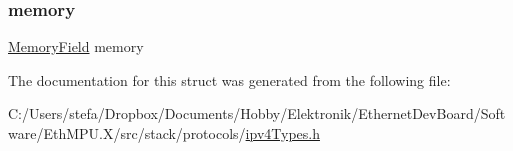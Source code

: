 \mbox{\label{structipv4_packet__t_a7dd6a3160ed58904a4699e281fc4617b}} 
\subsubsection{\texorpdfstring{memory}{memory}}
{\footnotesize\ttfamily \mbox{\hyperlink{group__memory_gae2c54b1b1aca949825bf68fe618c8e97}{Memory\+Field}} memory}



The documentation for this struct was generated from the following file\+:\begin{DoxyCompactItemize}
\item 
C\+:/\+Users/stefa/\+Dropbox/\+Documents/\+Hobby/\+Elektronik/\+Ethernet\+Dev\+Board/\+Software/\+Eth\+M\+P\+U.\+X/src/stack/protocols/\mbox{\hyperlink{ipv4_types_8h}{ipv4\+Types.\+h}}\end{DoxyCompactItemize}
